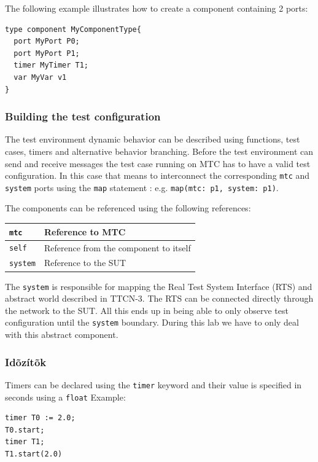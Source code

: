 \documentclass[a4paper]{article}
\begin{document}
The following example illustrates how to create a component containing 2 ports:

{\footnotesize
\begin{lstlisting}
type component MyComponentType{
  port MyPort P0;
  port MyPort P1;
  timer MyTimer T1;
  var MyVar v1
}
\end{lstlisting}
}

\subsubsection{Building the test configuration}

The test environment dynamic behavior can be described using functions, test cases, timers and alternative behavior
branching. Before the test environment can send and receive messages the test case running on MTC has to have a valid
test configuration. In this case that means to interconnect the corresponding \verb!mtc! and
\verb!system! ports using the \verb/map/ statement : e.g.
\verb!map(mtc: p1, system: p1)!.

The components can be referenced using the following references:

{\footnotesize
\begin{tabular}{|l|p{11cm}|}
    \hline
    \verb/mtc/ & Reference to MTC                        \\
    \hline
    \verb/self/ & Reference from the component to itself  \\
    \hline
    \verb/system/ & Reference to the SUT                    \\
    \hline
\end{tabular}
}

The \verb/system/ is responsible for mapping the Real Test System Interface (RTS) and abstract world
described in TTCN-3.
The RTS can be connected directly through the network to the SUT.
All this ends up in being able to only observe test configuration until the \verb/system/ boundary.
During this lab we have to only deal with this abstract component.

\subsubsection{Idõzítõk}
Timers can be declared using the \verb/timer/ keyword and their value is specified in seconds using a
\verb.float. Example:
{\footnotesize
\begin{lstlisting}
timer T0 := 2.0;
T0.start;
timer T1;
T1.start(2.0)
\end{lstlisting}
}
\end{document}
